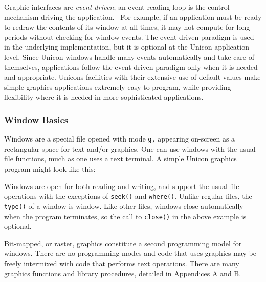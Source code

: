Graphic interfaces are \textit{event driven}; an
event-reading loop is the control mechanism driving the application.
\ For example, if an application must be ready to redraw the contents
of its window at all times, it may not compute for long periods without
checking for window events. The event-driven paradigm is used in the
underlying implementation, but it is optional at the Unicon application
level. Since Unicon windows handle many events automatically and
{\textquotedbl}take care of themselves{\textquotedbl}, applications
follow the event-driven paradigm only when it is needed and
appropriate. Unicon{\textquotesingle}s facilities with their extensive
use of default values make simple graphics applications extremely easy
to program, while providing flexibility where it is needed in more
sophisticated applications.

\subsubsection{Window Basics}

Windows are a special file opened with mode
\texttt{{\textquotedbl}g{\textquotedbl},} appearing on-screen as a
rectangular space for text and/or graphics. One can use windows with
the usual file functions, much as one uses a text terminal. A simple
Unicon graphics program might look like this:


Windows are open for both reading and writing, and support the usual
file operations with the exceptions of \texttt{seek()} and
\texttt{where()}. Unlike regular files, the \texttt{type()} of a
window is {\textquotedbl}window{\textquotedbl}. Like other files,
windows close automatically when the program terminates, so the call to
\texttt{close()} in the above example is optional.

Bit-mapped, or raster, graphics constitute a second programming model
for windows. There are no programming
{\textquotedbl}modes{\textquotedbl} and code that uses graphics may be
freely intermixed with code that performs text operations. There are
many graphics functions and library procedures, detailed in Appendices
A and B.

